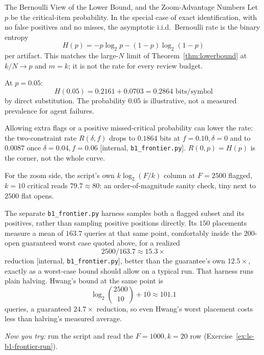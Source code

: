 \documentclass[11pt,a4paper]{article}
\theoremstyle{definition}
\theoremstyle{plain}
\begin{document}
%
\begin{pdexample}{The Bernoulli View of the Lower Bound, and the Zoom-Advantage Numbers}
\setlength{\parskip}{4pt plus 1pt}
Let $p$ be the critical-item probability. In the special case of exact
identification, with no false positives and no misses, the asymptotic
i.i.d.\ Bernoulli rate is the binary entropy
\[
H(p)=-p\log_2p-(1-p)\log_2(1-p)
\]
per artifact. This matches the large-$N$ limit of
Theorem~\ref{thm:lowerbound} at $k/N\to p$ and $m=k$; it is not the rate
for every review budget.

At $p=0.05$:
\[
H(0.05)=0.2161+0.0703=0.2864 \text{ bits/symbol}
\]
by direct substitution. The probability $0.05$ is illustrative, not a
measured prevalence for agent failures.

Allowing extra flags or a positive missed-critical probability can lower
the rate: the two-constraint rate $R(\delta,f)$ drops to $0.1864$ bits at $f=0.10,\delta=0$ and to $0.0087$ once $\delta=0.04,f=0.06$ [internal, \texttt{b1\_frontier.py}]. $R(0,p)=H(p)$ is the corner, not the whole curve.

For the zoom side, the script's own $k\log_2(F/k)$ column at $F=2500$ flagged, $k=10$ critical reads $79.7\approx80$: an order-of-magnitude sanity check, tiny next to $2500$ flat opens.

The separate \texttt{b1\_frontier.py} harness samples both a flagged subset
and its positives, rather than sampling positive positions directly. Its
$150$ placements measure a mean of $163.7$ queries at that same point, comfortably inside the $200$-open guaranteed worst case quoted above, for a realized
\[
2500/163.7\approx15.3\times
\]
reduction [internal, \texttt{b1\_frontier.py}], better than the guarantee's own $12.5\times$, exactly as a worst-case bound should allow on a typical run.
That harness runs plain halving. Hwang's bound at the same point is
\[
\log_2\binom{2500}{10}+10\approx101.1
\]
queries, a guaranteed $24.7\times$ reduction, so even Hwang's worst placement
costs less than halving's measured average.

\emph{Now you try:} run the script and read the $F{=}1000,k{=}20$ row (Exercise~\ref{ex:ls-b1-frontier-run}).
\end{pdexample}
\end{document}
